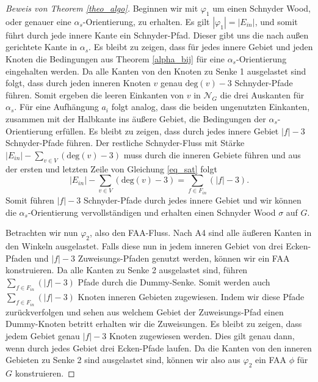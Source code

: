 \begin{proof}[Beweis von Theorem \ref{theo_algo}]
Beginnen wir mit $\varphi_1$ um einen Schnyder Wood, oder genauer eine $\alpha_s$-Orientierung, zu erhalten. Es gilt $|\varphi_1| = |E_{in}|$, und somit führt durch jede innere Kante ein Schnyder-Pfad. Dieser gibt uns die nach außen gerichtete Kante in $\alpha_s$. Es bleibt zu zeigen, dass für jedes innere Gebiet und jeden Knoten die Bedingungen aus Theorem \ref{alpha_bij} für eine $\alpha_s$-Orientierung eingehalten werden. Da alle Kanten von den Knoten zu Senke 1 ausgelastet sind folgt, dass durch jeden inneren Knoten $v$ genau $\text{deg}(v)-3$ Schnyder-Pfade führen. Somit ergeben die leeren Einkanten von $v$ in $\mathcal{N}_G$ die drei Auskanten für $\alpha_s$. Für eine Aufhängung $a_i$ folgt analog, dass die beiden ungenutzten Einkanten, zusammen mit der Halbkante ins äußere Gebiet, die Bedingungen der $\alpha_s$-Orientierung erfüllen. Es bleibt zu zeigen, dass durch jedes innere Gebiet $|f|-3$ Schnyder-Pfade führen. Der restliche Schnyder-Fluss mit Stärke $|E_{in}| - \sum_{v \in V} (\text{deg}(v)-3)$ muss durch die inneren Gebiete führen und aus der ersten und letzten Zeile von Gleichung \ref{eq_sat} folgt $$|E_{in}| - \sum_{v \in V} (\text{deg}(v)-3) = \sum_{f \in F_{in}} (|f|-3).$$
Somit führen $|f|-3$ Schnyder-Pfade durch jedes innere Gebiet und wir können die $\alpha_s$-Orientierung vervollständigen und erhalten einen Schnyder Wood $\sigma$ auf $G$.

Betrachten wir nun $\varphi_2$, also den FAA-Fluss. Nach A4 sind alle äußeren Kanten in den Winkeln ausgelastet. Falls diese nun in jedem inneren Gebiet von drei Ecken-Pfaden und $|f|-3$ Zuweisungs-Pfaden genutzt werden, können wir ein FAA konstruieren. Da alle Kanten zu Senke 2 ausgelastet sind, führen $\sum_{f \in F_{in}} (|f|-3)$ Pfade durch die Dummy-Senke. Somit werden auch $\sum_{f \in F_{in}} (|f|-3)$ Knoten inneren Gebieten zugewiesen. Indem wir diese Pfade zurückverfolgen und sehen aus welchem Gebiet der Zuweisungs-Pfad einen Dummy-Knoten betritt erhalten wir die Zuweisungen. Es bleibt zu zeigen, dass jedem Gebiet genau $|f|-3$ Knoten zugewiesen werden. Dies gilt genau dann, wenn durch jedes Gebiet drei Ecken-Pfade laufen. Da die Kanten von den inneren Gebieten zu Senke 2 sind ausgelastet sind, können wir also aus $\varphi_2$ ein FAA $\phi$ für $G$ konstruieren.


\end{proof}
